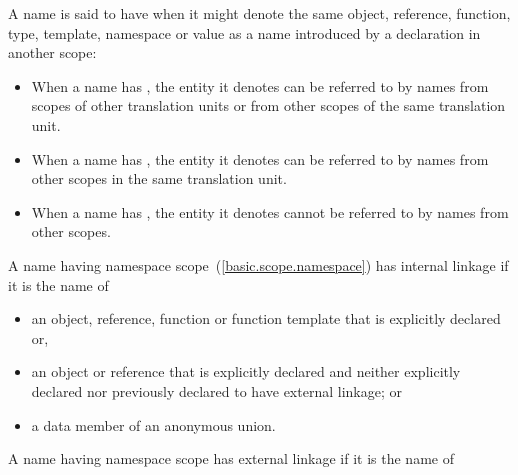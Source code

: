 \pnum
{}%
%
%
%
A name is said to have  when it might denote the same
object, reference, function, type, template, namespace or value as a
name introduced by a declaration in another scope:

\begin{itemize}
\item When a name has ,
the entity it denotes
can be referred to by names from scopes of other translation units or
from other scopes of the same translation unit.

\item When a name has ,
the entity it denotes
can be referred to by names from other scopes in the same translation
unit.

\item When a name has , the entity it denotes
cannot be referred to by names from other scopes.
\end{itemize}

\pnum
{}%
%
%
%
%
%
A name having namespace scope~(\ref{basic.scope.namespace}) has internal
linkage if it is the name of

\begin{itemize}
\item an object, reference, function or function template that is
explicitly declared  or,

\item an object or reference that is explicitly declared 
and neither explicitly declared  nor previously declared
to have external linkage; or

\item a data member of an anonymous union.
\end{itemize}

\pnum
A name having namespace scope has external linkage if it is the name of

